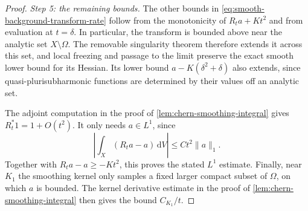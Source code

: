 \begin{proof}
\emph{Step 5: the remaining bounds.} The other bounds in \eqref{eq:smooth-background-transform-rate} follow from the monotonicity of $R_ta+Kt^2$ and from evaluation at $t=\delta$. In particular, the transform is bounded above near the analytic set $X\setminus\Omega$. The removable singularity theorem therefore extends it across this set, and local freezing and passage to the limit preserve the exact smooth lower bound for its Hessian. Its lower bound $a-K(\delta^2+\delta)$ also extends, since quasi-plurisubharmonic functions are determined by their values off an analytic set.

The adjoint computation in the proof of \cref{lem:chern-smoothing-integral} gives $R_t^*1=1+O(t^2)$. It only needs $a\in L^1$, since
\[
 \left|\int_X(R_ta-a)\,\mathrm{d}V\right|
 \leq Ct^2\|a\|_1.
\]
Together with $R_ta-a\geq-Kt^2$, this proves the stated $L^1$ estimate. Finally, near $K_1$ the smoothing kernel only samples a fixed larger compact subset of $\Omega$, on which $a$ is bounded. The kernel derivative estimate in the proof of \cref{lem:chern-smoothing-integral} then gives the bound $C_{K_1}/t$.
\end{proof}
